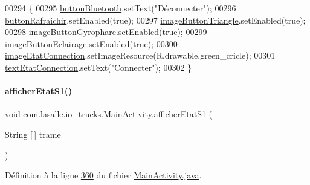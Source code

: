 \begin{DoxyCode}
00294     \{
00295         \hyperlink{classcom_1_1lasalle_1_1io__trucks_1_1_main_activity_a2197b0145db353437c41d1fc57f28650}{buttonBluetooth}.setText(\textcolor{stringliteral}{"Déconnecter"});
00296         \hyperlink{classcom_1_1lasalle_1_1io__trucks_1_1_main_activity_ac138932ce8d8dd12d7eb35496a1c9a16}{buttonRafraichir}.setEnabled(\textcolor{keyword}{true});
00297         \hyperlink{classcom_1_1lasalle_1_1io__trucks_1_1_main_activity_abe65c5762df1b63ee18b51fcb1bb23c8}{imageButtonTriangle}.setEnabled(\textcolor{keyword}{true});
00298         \hyperlink{classcom_1_1lasalle_1_1io__trucks_1_1_main_activity_aed3dc707e8acf48e821ebda3312a0dca}{imageButtonGyrophare}.setEnabled(\textcolor{keyword}{true});
00299         \hyperlink{classcom_1_1lasalle_1_1io__trucks_1_1_main_activity_a1cc3f48aebca6c187b2a964fa6f569fc}{imageButtonEclairage}.setEnabled(\textcolor{keyword}{true});
00300         \hyperlink{classcom_1_1lasalle_1_1io__trucks_1_1_main_activity_aa9d2b0a05a522c372879d3c35294d7bc}{imageEtatConnection}.setImageResource(R.drawable.green\_cricle);
00301         \hyperlink{classcom_1_1lasalle_1_1io__trucks_1_1_main_activity_a62ce189c543dda03ed48e00c10623677}{textEtatConnection}.setText(\textcolor{stringliteral}{"Connecter"});
00302     \}
\end{DoxyCode}
\mbox{\label{classcom_1_1lasalle_1_1io__trucks_1_1_main_activity_ac820f476b430c74a1201d9a906fd8429}} 
\paragraph{\texorpdfstring{afficher\+Etat\+S1()}{afficherEtatS1()}}
{\footnotesize\ttfamily void com.\+lasalle.\+io\+\_\+trucks.\+Main\+Activity.\+afficher\+Etat\+S1 (\begin{DoxyParamCaption}\item[{String \mbox{[}$\,$\mbox{]}}]{trame }\end{DoxyParamCaption})\hspace{0.3cm}{\ttfamily [private]}}



Définition à la ligne \hyperlink{_main_activity_8java_source_l00360}{360} du fichier \hyperlink{_main_activity_8java_source}{Main\+Activity.\+java}.



